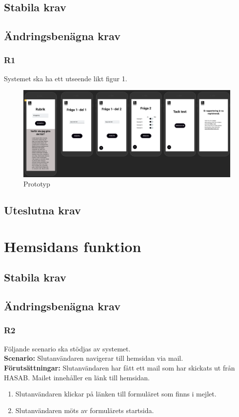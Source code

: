 \documentclass{article}
\begin{document}
    \subsection*{Stabila krav}
     
    \subsection*{Ändringsbenägna krav}
     \subsubsection*{R1}
    Systemet ska ha ett utseende likt figur 1.
    
    \begin{figure}[h!]
    \includegraphics[width=150mm]{prototyp.png}
     \caption{Prototyp}
    \end{figure}
    \subsection*{Uteslutna krav}
    
    \section{Hemsidans funktion}
    
    \subsection*{Stabila krav}
    \subsection*{Ändringsbenägna krav}
    
      \subsubsection*{R2}
    Följande scenario ska stödjas av systemet.
        \\
       \indent \textbf{Scenario:} Slutanvändaren navigerar till hemsidan via mail.
        \\
       \indent \textbf{Förutsättningar:} Slutanvändaren har fått ett mail som har skickats ut från HASAB. Mailet innehåller en länk till hemsidan.
            \begin{enumerate}
                \item Slutanvändaren klickar på länken till formuläret som finns i mejlet.
                \item Slutanvändaren möts av formulärets startsida.
            \end{enumerate}
            
\end{document}

